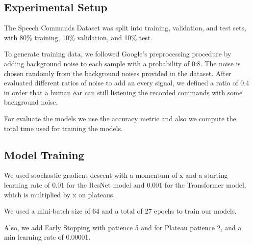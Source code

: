 \subsection{Experimental Setup}

The Speech Commands Dataset was
split into training, validation, and test sets, with 80\% training,
10\% validation, and 10\% test.

To generate training data, we followed Google's preprocessing
procedure by adding background noise to each
sample with a probability of 0:8. The noise is chosen randomly from the background noises provided
in the dataset. After evaluated different ratios of noise to add an every signal, we defined a ratio of 0.4 in order that a human ear can still listening the recorded commands with some background noise. 

For evaluate the models we use the accuracy metric and also we compute the total time used for training the models.

\subsection{Model Training}

We used stochastic gradient descent with a momentum of x and a starting learning rate of 0.01 for the ResNet model and 0.001 for the Transformer model, which is multiplied by x on plateaus. 

We used a mini-batch size of 64 and a total of 27 epochs to train our models.

Also, we add Early Stopping with patience 5 and for Plateau patience 2, and a min learning rate of 0.00001.